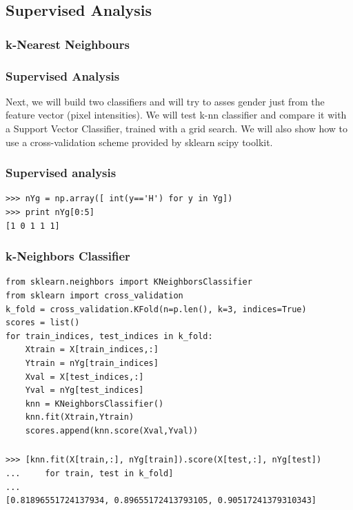 \documentclass[10pt, colorlinks]{beamer}
\begin{document}
\subsection{Supervised Analysis}
\subsubsection{k-Nearest Neighbours}

\begin{frame}[fragile]\frametitle{Supervised Analysis}
\begin{block}{}
Next, we will build two classifiers and will try to asses gender just from the feature vector (pixel intensities). We will test k-nn classifier and compare it with a Support Vector Classifier, trained with a grid search. We will also show how to use a cross-validation scheme provided by sklearn scipy toolkit.
\end{block}

\end{frame}
\begin{frame}[fragile]\frametitle{Supervised analysis}
\begin{verbatim}
>>> nYg = np.array([ int(y=='H') for y in Yg])
>>> print nYg[0:5]
[1 0 1 1 1]
\end{verbatim}

\end{frame}
\begin{frame}[fragile]\frametitle{k-Neighbors Classifier}
\begin{verbatim}
from sklearn.neighbors import KNeighborsClassifier
from sklearn import cross_validation
k_fold = cross_validation.KFold(n=p.len(), k=3, indices=True)
scores = list()
for train_indices, test_indices in k_fold:
    Xtrain = X[train_indices,:]
    Ytrain = nYg[train_indices]
    Xval = X[test_indices,:]
    Yval = nYg[test_indices]
    knn = KNeighborsClassifier()
    knn.fit(Xtrain,Ytrain)
    scores.append(knn.score(Xval,Yval))
\end{verbatim}

\end{frame}
\begin{frame}[fragile]\frametitle{}
\small
\begin{verbatim}
>>> [knn.fit(X[train,:], nYg[train]).score(X[test,:], nYg[test]) 
...     for train, test in k_fold]
... 
[0.81896551724137934, 0.89655172413793105, 0.90517241379310343]
\end{verbatim}

\end{frame}
\end{document}

